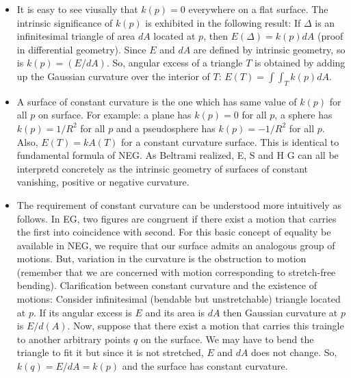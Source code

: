 \documentclass[12pt]{article}
\begin{document}
\begin{itemize}
    \item It is easy to see viusally that $k(p)=0$ everywhere on a flat surface. The intrinsic significance of $k(p)$ is exhibited in the following result: If $\Delta$ is an infinitesimal triangle of area $dA$ located at $p$, then $E(\Delta) = k(p)dA$ (proof in differential geometry). Since $E$ and $dA$ are defined by intrinsic geometry, so is $k(p) = (E/dA)$. So, angular excess of a triangle $T$ is obtained by adding up the Gaussian curvature over the interior of $T$: $E(T) = \int\int_{T}k(p)dA$.

    \item A surface of constant curvature is the one which has same value of $k(p)$ for all $p$ on surface. For example: a plane has $k(p)=0$ for all $p$, a sphere has $k(p)=1/R^2$ for all $p$ and a pseudosphere has $k(p)=-1/R^2$ for all $p$. Also, $E(T) = kA(T)$ for a constant curvature surface. This is identical to fundamental formula of NEG. As Beltrami realized, E, S and H G can all be interpretd concretely as the intrinsic geometry of surfaces of constant vanishing, positive or negative curvature.

    \item The requirement of constant curvature can be understood more intuitively as follows. In EG, two figures are congruent if there exist a motion that carries the first into coincidence with second. For this basic concept of equality be available in NEG, we require that our surface admits an analogous group of motions. But, variation in the curvature is the obstruction to motion (remember that we are concerned with motion corresponding to stretch-free bending). Clarification between constant curvature and the existence of motions: Consider infinitesimal (bendable but unstretchable) triangle located at $p$. If its angular excess is $E$ and its area is $dA$ then Gaussian curvature at $p$ is $E/d(A)$. Now, suppose that there exist a motion that carries this traingle to another arbitrary points $q$ on the surface. We may have to bend the triangle to fit it but since it is not stretched, $E$ and $dA$ does not change. So, $k(q)=E/dA=k(p)$ and the surface has constant curvature.


\end{itemize}
\end{document}
